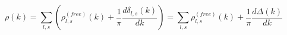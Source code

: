 \begin{equation}
\rho(k)=\sum_{l,s}\left(\rho_{l,s}^{(free)}(k)+\frac{1}{\pi}\frac{d\delta_{l,s}(k)}{dk}\right)=\sum_{l,s}\rho_{l,s}^{(free)}(k)+\frac{1}{\pi}\frac{d\Delta(k)}{dk}
\end{equation}


